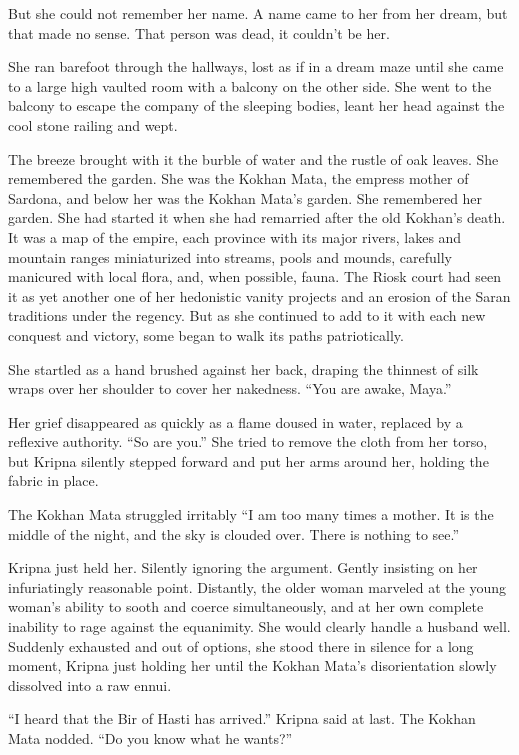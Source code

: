 \documentclass{article}
\begin{document}
	But she could not remember her name. A name came to her from her dream, but that made no sense. That person was dead, it couldn’t be her.
	
	She ran barefoot through the hallways, lost as if in a dream maze until she came to a large high vaulted room with a balcony on the other side. She went to the balcony to escape the company of the sleeping bodies, leant her head against the cool stone railing and wept. 
	
	The breeze brought with it the burble of water and the rustle of oak leaves. She remembered the garden. She was the Kokhan Mata, the empress mother of Sardona, and below her was the Kokhan Mata’s garden. She remembered her garden. She had started it when she had remarried after the old Kokhan’s death. It was a map of the empire, each province with its major rivers, lakes and mountain ranges miniaturized into streams, pools and mounds, carefully manicured with local flora, and, when possible, fauna. The Riosk court had seen it as yet another one of her hedonistic vanity projects and an erosion of the Saran traditions under the regency. But as she continued to add to it with each new conquest and victory, some began to walk its paths patriotically. 
	
	She startled as a hand brushed against her back, draping the thinnest of silk wraps over her shoulder to cover her nakedness. “You are awake, Maya.” 
	
	Her grief disappeared as quickly as a flame doused in water, replaced by a reflexive authority. “So are you.” She tried to remove the cloth from her torso, but Kripna silently stepped forward and put her arms around her, holding the fabric in place. 
	
	The Kokhan Mata struggled irritably “I am too many times a mother. It is the middle of the night, and the sky is clouded over. There is nothing to see.”
	
	Kripna just held her. Silently ignoring the argument. Gently insisting on her infuriatingly reasonable point. Distantly, the older woman marveled at the young woman’s ability to sooth and coerce simultaneously, and at her own complete inability to rage against the equanimity. She would clearly handle a husband well.  Suddenly exhausted and out of options, she stood there in silence for a long moment, Kripna just holding her until the Kokhan Mata’s disorientation slowly dissolved into a raw ennui.
	
	“I heard that the Bir of Hasti has arrived.” Kripna said at last. The Kokhan Mata nodded. “Do you know what he wants?”
	
\end{document}
